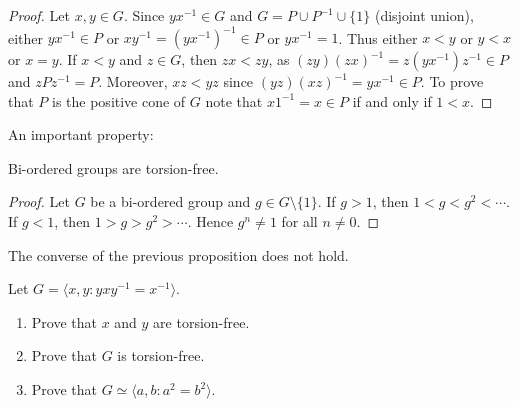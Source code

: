 \begin{proof}
	Let $x,y\in G$. Since $yx^{-1}\in G$ and $G=P\cup
	P^{-1}\cup\{1\}$ (disjoint union), 
	either $yx^{-1}\in P$ or $xy^{-1}=(yx^{-1})^{-1}\in
	P$ or $yx^{-1}=1$. Thus either $x<y$ or $y<x$ or $x=y$. If $x<y$ and $z\in
	G$, then $zx<zy$, as $(zy)(zx)^{-1}=z(yx^{-1})z^{-1}\in P$ and  
	$zPz^{-1}=P$. Moreover, $xz<yz$ since $(yz)(xz)^{-1}=yx^{-1}\in P$. To prove
	that $P$ is the positive cone of $G$ note that 
	$x1^{-1}=x\in P$ if and only if $1<x$. 
\end{proof}

An important property:

\begin{proposition}
	\label{pro:BOsintorsion}
	Bi-ordered groups are torsion-free.
\end{proposition}

\begin{proof}
	Let $G$ be a bi-ordered group and $g\in G\setminus\{1\}$. 
	If $g>1$, then
	$1<g<g^2<\cdots$. If $g<1$, then $1>g>g^2>\cdots$. Hence $g^n\ne 1$ 
	for all $n\ne 0$. 
\end{proof}

The converse of the previous proposition does not hold. 

\begin{exercise}
Let $G=\langle x,y:yxy^{-1}=x^{-1}\rangle$. 
\begin{enumerate}
    \item Prove that $x$ and $y$ are torsion-free. 
    \item Prove that $G$ is torsion-free. 
    \item Prove that $G\simeq \langle a,b:a^2=b^2\rangle$.
\end{enumerate}
\end{exercise}




